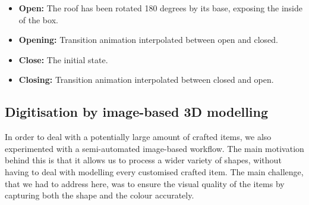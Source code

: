 \documentclass[acmlarge,screen,dvipsnames]{acmart}
\begin{document}
\begin{itemize} 
  \item \textbf{Open:}
The roof has been rotated 180 degrees by its base, exposing the inside of the
box. 
\item \textbf{Opening:} Transition animation interpolated between open
and closed. 
\item \textbf{Close:} The initial state.  
\item \textbf{Closing:} Transition animation interpolated between closed and open. 

\end{itemize}






\subsection{Digitisation by image-based 3D modelling}
In order to deal with a potentially large amount of crafted items, we
also experimented with a semi-automated image-based workflow. The main
motivation behind this is that it allows us to process a wider variety
of shapes, without having to deal with modelling every customised crafted item. The main challenge, that we had to address here, was to ensure the visual quality of the items by capturing both the
shape and the colour accurately. 
\end{document}
